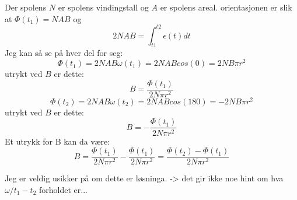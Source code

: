 \documentclass[12pt,a4paper,leqno]{report}
\begin{document}
Der spolens $N$ er spolens vindingstall og $A$ er spolens areal.
orientasjonen er slik at $\Phi(t_1)=NAB$ og 
\begin{equation}
2NAB=\int_{t1}^{t2}\epsilon(t)dt
\end{equation}
Jeg kan så se på hver del for seg:
\begin{equation}
\Phi(t_1)=2NAB\omega(t_1)=2NABcos(0)=2NB\pi r^2
\end{equation}
utrykt ved $B$ er dette:
\begin{equation}
B=\frac{\Phi(t_1)}{2N \pi r^2}
\end{equation}
\begin{equation}
\Phi(t_2)=2NAB\omega(t_2)=2NABcos(180)=-2NB\pi r^2
\end{equation}
utrykt ved $B$ er dette:
\begin{equation}
B=-\frac{\Phi(t_1)}{2N \pi r^2}
\end{equation}
Et utrykk for B kan da være:
\begin{equation}
B=\frac{\Phi(t_1)}{2N \pi r^2}-\frac{\Phi(t_1)}{2N \pi r^2}=\frac{\Phi(t_2)-\Phi(t_1)}{2N \pi r^2}
\end{equation}


Jeg er veldig usikker på om dette er løsninga. -> det gir ikke noe hint om hva $\omega/t_1-t_2$ forholdet er...
\end{document}
